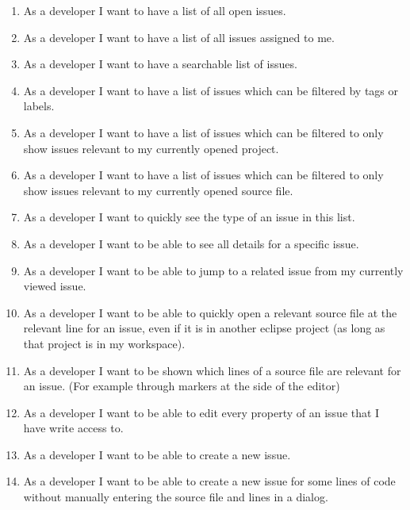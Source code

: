 \begin{enumerate}
	\item As a developer I want to have a list of all open issues. \label{itm:ch3:req:filter_open}
	\item As a developer I want to have a list of all issues assigned to me. \label{itm:ch3:req:filter_me}
	\item As a developer I want to have a searchable list of issues. \label{itm:ch3:req:filter_search}
	\item As a developer I want to have a list of issues which can be filtered by tags or labels. \label{itm:ch3:req:filter_labels}
	\item As a developer I want to have a list of issues which can be filtered to only show issues relevant to my currently opened project. \label{itm:ch3:req:filter_open project}
	\item As a developer I want to have a list of issues which can be filtered to only show issues relevant to my currently opened source file. \label{itm:ch3:req:filter_open_file}
	\item As a developer I want to quickly see the type of an issue in this list. \label{itm:ch3:req:list_issue_type}
	\item As a developer I want to be able to see all details for a specific issue.
	\item As a developer I want to be able to jump to a related issue from my currently viewed issue.
	\item As a developer I want to be able to quickly open a relevant source file at the relevant line for an issue, even if it is in another eclipse project (as long as that project is in my workspace).
	\item As a developer I want to be shown which lines of a source file are relevant for an issue. (For example through markers at the side of the editor) \label{itm:ch3:req:source_file_marker}
	\item As a developer I want to be able to edit every property of an issue that I have write access to.
	\item As a developer I want to be able to create a new issue.
	\item As a developer I want to be able to create a new issue for some lines of code without manually entering the source file and lines in a dialog.
	\setcounter{enumarteCounter}{\value{enumi}} %
\end{enumerate}

